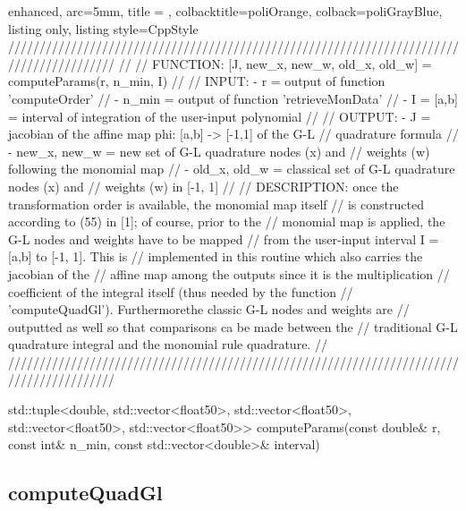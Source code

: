\documentclass[a4paper, twosided]{book}
\begin{document}
\begin{tcblisting}{enhanced,
                   arc=5mm,
                   title = \color{black}{\large \ttfamily MonMap.cpp/computeParams},
                   colbacktitle=poliOrange,
                   colback=poliGrayBlue,
                   listing only,
                   listing style=CppStyle}
/////////////////////////////////////////////////////////////////////////////////////////
//
//       FUNCTION: [J, {new_x, new_w, old_x, old_w}] = computeParams(r, n_min, I)
//                
//          INPUT: - r = output of function 'computeOrder'
//                 - n_min = output of function 'retrieveMonData'
//                 - I = [a,b] = interval of integration of the user-input polynomial
//
//         OUTPUT: - J = jacobian of the affine map phi: [a,b] -> [-1,1] of the G-L 
//                       quadrature formula
//                 - {new_x, new_w} = new set of G-L quadrature nodes (x) and
//                                    weights (w) following the monomial map
//                 - {old_x, old_w} = classical set of G-L quadrature nodes (x) and
//                                    weights (w) in [-1, 1]
//
//    DESCRIPTION: once the transformation order is available, the monomial map itself
//                 is constructed according to (55) in [1]; of course, prior to the 
//                 monomial map is applied, the G-L nodes and weights have to be mapped
//                 from the user-input interval I = [a,b] to [-1, 1]. This is 
//                 implemented in this routine which also carries the jacobian of the
//                 affine map among the outputs since it is the multiplication
//                 coefficient of the integral itself (thus needed by the function
//                 'computeQuadGl'). Furthermorethe classic G-L nodes and weights are
//                 outputted as well so that comparisons ca be made between the
//                 traditional G-L quadrature integral and the monomial rule quadrature.
//
/////////////////////////////////////////////////////////////////////////////////////////

std::tuple<double, std::vector<float50>, std::vector<float50>, std::vector<float50>, std::vector<float50>> computeParams(const double& r, const int& n_min, const std::vector<double>& interval)
\end{tcblisting}

\newpage
\subsection[computeQuadGl]{\changefont computeQuadGl}\label{SubSec4.1.6}
\end{document}
